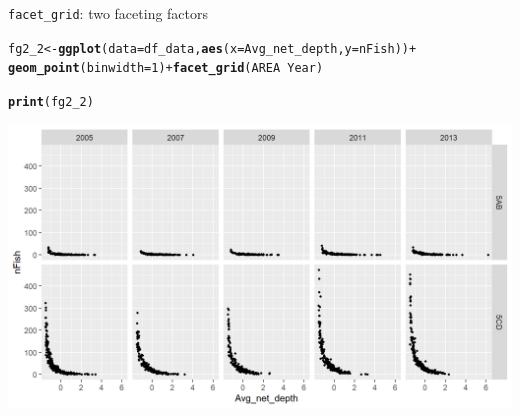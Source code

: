 \documentclass{beamer}\usepackage[]{graphicx}\usepackage[]{color}
\makeatletter
\newcommand{\hlnum}[1]{\textcolor[rgb]{0.686,0.059,0.569}{#1}}%
\newcommand{\hlopt}[1]{\textcolor[rgb]{0,0,0}{#1}}%
\newcommand{\hlstd}[1]{\textcolor[rgb]{0.345,0.345,0.345}{#1}}%
\newcommand{\hlkwb}[1]{\textcolor[rgb]{0.69,0.353,0.396}{#1}}%
\newcommand{\hlkwc}[1]{\textcolor[rgb]{0.333,0.667,0.333}{#1}}%
\newcommand{\hlkwd}[1]{\textcolor[rgb]{0.737,0.353,0.396}{\textbf{#1}}}%
\newenvironment{kframe}{%
 \def\at@end@of@kframe{}%
 \ifinner\ifhmode%
  \def\at@end@of@kframe{\end{minipage}}%
  \begin{minipage}{\columnwidth}%
 \fi\fi%
 \def\FrameCommand##1{\hskip\@totalleftmargin \hskip-\fboxsep
 \colorbox{shadecolor}{##1}\hskip-\fboxsep
     \hskip-\linewidth \hskip-\@totalleftmargin \hskip\columnwidth}%
 \MakeFramed {\advance\hsize-\width
   \@totalleftmargin\z@ \linewidth\hsize
   \@setminipage}}%
 {\par\unskip\endMakeFramed%
 \at@end@of@kframe}
\newenvironment{knitrout}{}{} %
\makeatother
\begin{document}
\begin{frame}[fragile]{\lstinline{facet_grid}: two faceting factors}
\begin{knitrout}\footnotesize
{}\color{fgcolor}\begin{kframe}
\begin{alltt}
\hlstd{fg2_2} \hlkwb{<-} \hlkwd{ggplot}\hlstd{(}\hlkwc{data}\hlstd{=df_data,} \hlkwd{aes}\hlstd{(}\hlkwc{x}\hlstd{=Avg_net_depth,} \hlkwc{y}\hlstd{=nFish))} \hlopt{+}
  \hlkwd{geom_point}\hlstd{(}\hlkwc{binwidth}\hlstd{=}\hlnum{1}\hlstd{)} \hlopt{+} \hlkwd{facet_grid}\hlstd{(AREA} \hlopt{~} \hlstd{Year)}
\end{alltt}


{\ttfamily\noindent\bfseries\color{errorcolor}{\#\# Error: Unknown parameters: binwidth}}\begin{alltt}
\hlkwd{print}\hlstd{(fg2_2)}
\end{alltt}
\end{kframe}

{\centering \includegraphics[width=.9\linewidth]{figure/facet_grid_5-1} 

}



\end{knitrout}
\end{frame}
\end{document}
